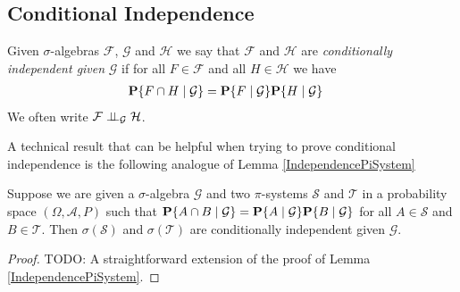 \subsection{Conditional Independence}

\begin{defn}Given $\sigma$-algebras $\mathcal{F}$, $\mathcal{G}$ and
  $\mathcal{H}$ we say that $\mathcal{F}$ and $\mathcal{H}$ are
  \emph{conditionally independent given} $\mathcal{G}$ if for all $F
  \in \mathcal{F}$ and all $H \in \mathcal{H}$ we have 
\begin{align*}
\cprobability{\mathcal{G}}{F \cap H} &= \cprobability{\mathcal{G}}{F} \cprobability{\mathcal{G}}{H} 
\end{align*}
We often write $\cindependent{\mathcal{F}}{\mathcal{H}}{\mathcal{G}}$.
\end{defn}

A technical result that can be helpful when trying to prove
conditional independence is the following analogue of Lemma
\ref{IndependencePiSystem}
\begin{lem}\label{ConditionalIndependencePiSystem}Suppose we are given
  a $\sigma$-algebra $\mathcal{G}$ and two
  $\pi$-systems $\mathcal{S}$ and $\mathcal{T}$ in a probability space
  $(\Omega, \mathcal{A}, P)$ such that
  $\cprobability{\mathcal{G}}{A \cap B} = \cprobability{\mathcal{G}}{A} \cprobability{\mathcal{G}}{B}$ for all
  $A \in \mathcal{S}$ and $B \in \mathcal{T}$.  Then
  $\sigma(\mathcal{S})$ and $\sigma(\mathcal{T})$ are conditionally independent
  given $\mathcal{G}$.
\end{lem}
\begin{proof}
TODO: A straightforward extension of the proof of Lemma
\ref{IndependencePiSystem}.
\end{proof}

